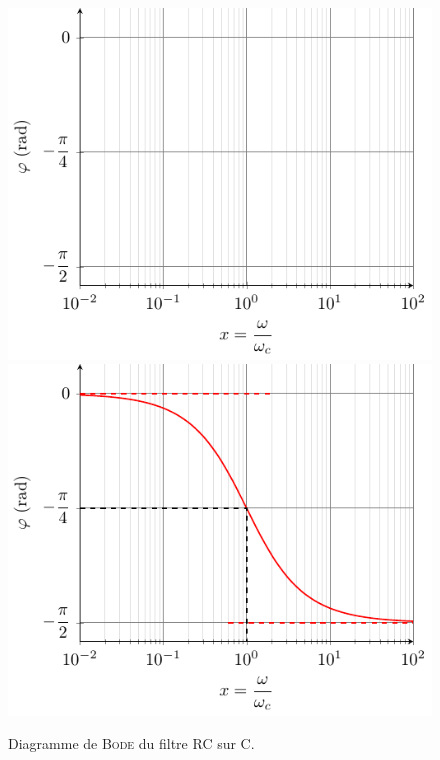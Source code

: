 \documentclass[../../main/main.tex]{subfiles}
\begin{document}
\begin{figure}[h!]
{{			\includegraphics[width=\linewidth]{RCC_bode-phase_plain}
		}{%
			\includegraphics[width=\linewidth]{RCC_bode-phase}
		}%
		\vspace{-15pt}
	}%
	\caption{Diagramme de \textsc{Bode} du filtre RC sur C.}
	\label{fig:rccbode}
\end{figure}
\end{document}
